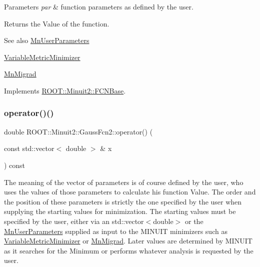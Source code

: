 \begin{DoxyParams}{Parameters}
{\em par} & function parameters as defined by the user.\\
\hline
\end{DoxyParams}
\begin{DoxyReturn}{Returns}
the Value of the function.
\end{DoxyReturn}
\begin{DoxySeeAlso}{See also}
\mbox{\hyperlink{classROOT_1_1Minuit2_1_1MnUserParameters}{Mn\+User\+Parameters}} 

\mbox{\hyperlink{classROOT_1_1Minuit2_1_1VariableMetricMinimizer}{Variable\+Metric\+Minimizer}} 

\mbox{\hyperlink{classROOT_1_1Minuit2_1_1MnMigrad}{Mn\+Migrad}} 
\end{DoxySeeAlso}


Implements \mbox{\hyperlink{classROOT_1_1Minuit2_1_1FCNBase_ae4a86bd94d0d0f5ca6fc8f8ab2bb43cd}{R\+O\+O\+T\+::\+Minuit2\+::\+F\+C\+N\+Base}}.

\mbox{\label{classROOT_1_1Minuit2_1_1GaussFcn2_ad90e2fe9c9a2392c1e110a3e4679bfc3}} 
\subsubsection{\texorpdfstring{operator()()}{operator()()}\hspace{0.1cm}{\footnotesize\ttfamily [2/2]}}
{\footnotesize\ttfamily double R\+O\+O\+T\+::\+Minuit2\+::\+Gauss\+Fcn2\+::operator() (\begin{DoxyParamCaption}\item[{const std\+::vector$<$ double $>$ \&}]{x }\end{DoxyParamCaption}) const\hspace{0.3cm}{\ttfamily [virtual]}}

The meaning of the vector of parameters is of course defined by the user, who uses the values of those parameters to calculate his function Value. The order and the position of these parameters is strictly the one specified by the user when supplying the starting values for minimization. The starting values must be specified by the user, either via an std\+::vector$<$double$>$ or the \mbox{\hyperlink{classROOT_1_1Minuit2_1_1MnUserParameters}{Mn\+User\+Parameters}} supplied as input to the M\+I\+N\+U\+IT minimizers such as \mbox{\hyperlink{classROOT_1_1Minuit2_1_1VariableMetricMinimizer}{Variable\+Metric\+Minimizer}} or \mbox{\hyperlink{classROOT_1_1Minuit2_1_1MnMigrad}{Mn\+Migrad}}. Later values are determined by M\+I\+N\+U\+IT as it searches for the Minimum or performs whatever analysis is requested by the user.


